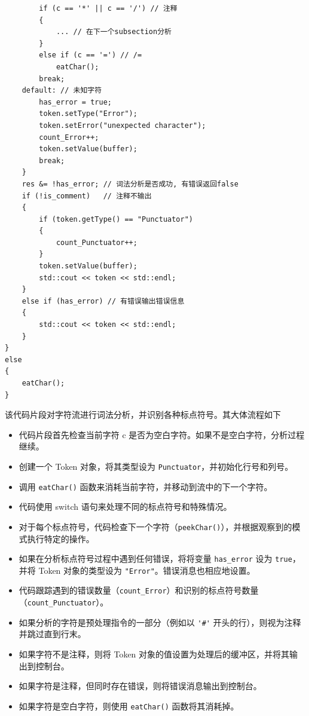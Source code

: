 \documentclass[lang=cn,11pt,a4paper]{elegantpaper}
\begin{document}
\begin{lstlisting}
        if (c == '*' || c == '/') // 注释
        {
            ... // 在下一个subsection分析
        }
        else if (c == '=') // /=
            eatChar();
        break;
    default: // 未知字符
        has_error = true;
        token.setType("Error");
        token.setError("unexpected character");
        count_Error++;
        token.setValue(buffer);
        break;
    }
    res &= !has_error; // 词法分析是否成功, 有错误返回false
    if (!is_comment)   // 注释不输出
    {
        if (token.getType() == "Punctuator")
        {
            count_Punctuator++;
        }
        token.setValue(buffer);
        std::cout << token << std::endl;
    }
    else if (has_error) // 有错误输出错误信息
    {
        std::cout << token << std::endl;
    }
}
else
{
    eatChar();
}
\end{lstlisting}

该代码片段对字符流进行词法分析，并识别各种标点符号。其大体流程如下

\begin{itemize}
    \item 代码片段首先检查当前字符 c 是否为空白字符。如果不是空白字符，分析过程继续。
    \item 创建一个 Token 对象，将其类型设为 \lstinline"Punctuator"，并初始化行号和列号。
    \item 调用 \lstinline{eatChar()} 函数来消耗当前字符，并移动到流中的下一个字符。
    \item 代码使用 switch 语句来处理不同的标点符号和特殊情况。
    \item 对于每个标点符号，代码检查下一个字符（\lstinline{peekChar()}），并根据观察到的模式执行特定的操作。
    \item 如果在分析标点符号过程中遇到任何错误，将将变量 \lstinline{has_error} 设为 \lstinline{true}，并将 Token 对象的类型设为 \lstinline{"Error"}。错误消息也相应地设置。
    \item 代码跟踪遇到的错误数量（\lstinline{count_Error}）和识别的标点符号数量（\lstinline{count_Punctuator}）。
    \item 如果分析的字符是预处理指令的一部分（例如以 \lstinline{'#'} 开头的行），则视为注释并跳过直到行末。
    \item 如果字符不是注释，则将 Token 对象的值设置为处理后的缓冲区，并将其输出到控制台。
    \item 如果字符是注释，但同时存在错误，则将错误消息输出到控制台。
    \item 如果字符是空白字符，则使用 \lstinline{eatChar()} 函数将其消耗掉。
\end{itemize}
\end{document}
